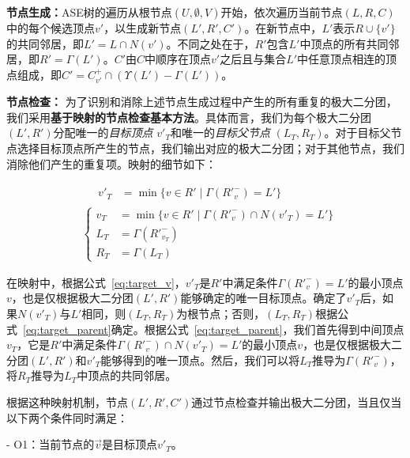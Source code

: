 
\textbf{节点生成：}ASE树的遍历从根节点$(U, \emptyset, V)$开始，依次遍历当前节点$(L, R, C)$中的每个候选顶点$v'$，以生成新节点$(L', R', C')$。在新节点中，$L'$表示$R\cup\{v'\}$的共同邻居，即$L' = L\cap N(v')$。不同之处在于，$R'$包含$L'$中顶点的所有共同邻居，即$R' = \Gamma(L')$。$C'$由$C$中顺序在顶点$v'$之后且与集合$L'$中任意顶点相连的顶点组成，即$C'= C_{v'}^+ \cap (\Upsilon(L') - \Gamma(L'))$。

\textbf{节点检查：} 为了识别和消除上述节点生成过程中产生的所有重复的极大二分团，我们采用\textbf{基于映射的节点检查基本方法}。具体而言，我们为每个极大二分团$(L', R')$分配唯一的\emph{目标顶点} $v'_T$和唯一的\emph{目标父节点} $(L_T, R_T)$。对于目标父节点选择目标顶点所产生的节点，我们输出对应的极大二分团；对于其他节点，我们消除他们产生的重复项。映射的细节如下：

\vspace{-0.5in}
\begin{align}
	\label{eq:target_v}
	& \begin{aligned}
		\hspace{13pt} v'_T &= \min\{v \in R' \mid \Gamma({R'}_{v}^-) = L' \}
	\end{aligned} \\
	\label{eq:target_parent}
	& \left\{
	\begin{aligned}
		v_T &= \min\{v \in R' \mid \Gamma({R'}_{v}^-) \cap N(v'_T) = L'\} \\
		L_T &= \Gamma({R'}_{v_T}^-) \\
		R_T &= \Gamma(L_T)
	\end{aligned}
	\right.
\end{align}


在映射中，根据公式~\ref{eq:target_v}，$v'_T$是$R'$中满足条件$\Gamma({R'}_{v}^-) = L'$的最小顶点$v$，也是仅根据极大二分团$(L', R')$能够确定的唯一目标顶点。确定了$v'_T$后，如果$N(v'_T)$与$L'$相同，则$(L_T, R_T)$为根节点；否则，$(L_T, R_T)$根据公式~\ref{eq:target_parent}确定。根据公式~\ref{eq:target_parent}，我们首先得到中间顶点$v_T$，它是$R'$中满足条件$\Gamma({R'}_{v}^-) \cap N(v'_T) = L'$的最小顶点$v$，也是仅根据极大二分团$(L', R')$和$v'_T$能够得到的唯一顶点。然后，我们可以将$L_T$推导为$\Gamma({R'}_{v}^-)$，将$R_T$推导为$L_T$中顶点的共同邻居。

根据这种映射机制，节点$(L', R', C')$通过节点检查并输出极大二分团，当且仅当以下两个条件同时满足：

- O1：当前节点的$\vec{v}$是目标顶点$v'_T$。

